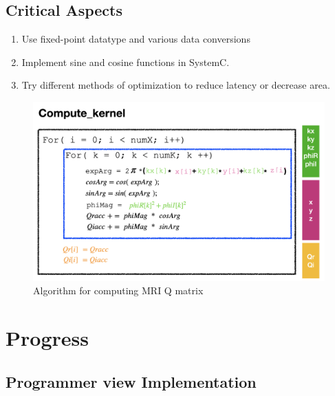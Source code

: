 \documentclass{sig-alternate}
\begin{document}
\subsection{Critical Aspects}
\begin{enumerate}
\setlength\itemsep{-0.15em}
\item Use fixed-point datatype and various data conversions
\item Implement sine and cosine functions in SystemC.
\item Try different methods of optimization to reduce latency or decrease area.
\end{enumerate}

\begin{figure}[t]
\centering
\captionsetup{justification=centering, format=hang}
\includegraphics[width=0.85\columnwidth]{figure/algorithm.png}
\caption{Algorithm for computing MRI Q matrix~\cite{stone2008accelerating}}
\label{fig-1}
\end{figure}



\section{Progress}

\subsection{Programmer view Implementation}
\end{document}
